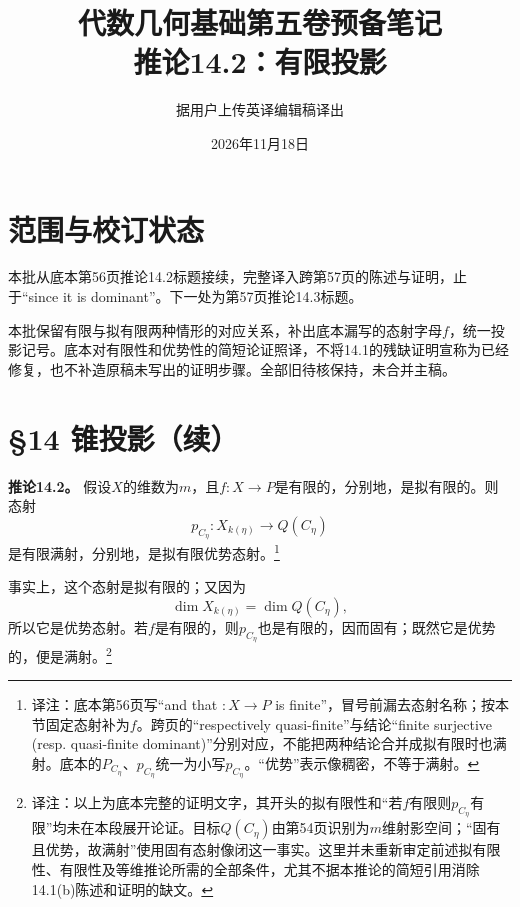 \documentclass[openany,fontset=fandol]{ctexbook}
\newcommand{\note}[1]{\footnote{译注：#1}}
\begin{document}
\title{代数几何基础第五卷预备笔记\\推论14.2：有限投影}
\author{据用户上传英译编辑稿译出}
\date{2026年11月18日}
\maketitle
\chapter*{范围与校订状态}
本批从底本第56页推论14.2标题接续，完整译入跨第57页的陈述与证明，止于“since it is dominant”。下一处为第57页推论14.3标题。

本批保留有限与拟有限两种情形的对应关系，补出底本漏写的态射字母$f$，统一投影记号。底本对有限性和优势性的简短论证照译，不将14.1的残缺证明宣称为已经修复，也不补造原稿未写出的证明步骤。全部旧待核保持，未合并主稿。
\chapter*{§14 锥投影（续）}
\noindent\textbf{推论14.2。}
假设$X$的维数为$m$，且$f:X\to P$是有限的，分别地，是拟有限的。则态射
\[
p_{C_\eta}:X_{k(\eta)}\longrightarrow Q(C_\eta)
\]
是有限满射，分别地，是拟有限优势态射。\note{底本第56页写“and that $:X\to P$ is finite”，冒号前漏去态射名称；按本节固定态射补为$f$。跨页的“respectively quasi-finite”与结论“finite surjective (resp. quasi-finite dominant)”分别对应，不能把两种结论合并成拟有限时也满射。底本的$P_{C_\eta}$、$p_{C_\eta}$统一为小写$p_{C_\eta}$。“优势”表示像稠密，不等于满射。}

事实上，这个态射是拟有限的；又因为
\[
\dim X_{k(\eta)}=\dim Q(C_\eta),
\]
所以它是优势态射。若$f$是有限的，则$p_{C_\eta}$也是有限的，因而固有；既然它是优势的，便是满射。\note{以上为底本完整的证明文字，其开头的拟有限性和“若$f$有限则$p_{C_\eta}$有限”均未在本段展开论证。目标$Q(C_\eta)$由第54页识别为$m$维射影空间；“固有且优势，故满射”使用固有态射像闭这一事实。这里并未重新审定前述拟有限性、有限性及等维推论所需的全部条件，尤其不据本推论的简短引用消除14.1(b)陈述和证明的缺文。}
\end{document}
